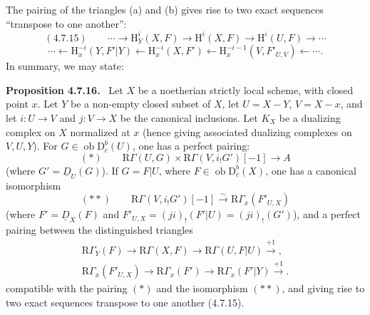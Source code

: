 \documentclass[11pt]{article}
\newenvironment{statement}[1]{\par\medskip\noindent\textbf{#1.}\ }{\par\medskip}
\renewcommand{\H}{\mathrm{H}}
\newcommand{\R}{\mathrm{R}}
\newcommand{\D}{\mathrm{D}}
\newcommand{\ob}{\operatorname{ob}}
\begin{document}
The pairing of the triangles (a) and (b) gives rise to two exact sequences ``transpose to one another'':
\[
(4.7.15)\qquad \cdots\longrightarrow \H_Y^i(X,F)\longrightarrow\H^i(X,F)\longrightarrow\H^i(U,F)\longrightarrow\cdots
\]
\[
\cdots\longleftarrow \H_x^{-i}(Y,F'|Y)\longleftarrow\H_x^{-i}(X,F')\longleftarrow\H_x^{-i-1}(V,F'_{U,V})\longleftarrow\cdots.
\]
In summary, we may state:

\begin{statement}{Proposition 4.7.16}
Let $X$ be a noetherian strictly local scheme, with closed point $x$. Let $Y$ be a non-empty closed subset of $X$, let $U=X-Y$, $V=X-x$, and let $i:U\to V$ and $j:V\to X$ be the canonical inclusions. Let $K_X$ be a dualizing complex on $X$ normalized at $x$ (hence giving associated dualizing complexes on $V,U,Y$). For $G\in\ob\D_c^b(U)$, one has a perfect pairing:
\[
(*)\qquad \R\Gamma(U,G)\times\R\Gamma(V,i_!G')[-1]\longrightarrow A
\]
(where $G'=\underline{D}_U(G)$). If $G=F|U$, where $F\in\ob\D_c^b(X)$, one has a canonical isomorphism
\[
(**)\qquad \R\Gamma(V,i_!G')[-1]\xrightarrow{\sim}\R\Gamma_x(F'_{U,X})
\]
(where $F'=\underline{D}_X(F)$ and $F'_{U,X}=(ji)_!(F'|U)=(ji)_!(G')$), and a perfect pairing between the distinguished triangles
\[
\begin{gathered}
\R\Gamma_Y(F)\longrightarrow \R\Gamma(X,F)\longrightarrow \R\Gamma(U,F|U)\xrightarrow{+1},\\
\R\Gamma_x(F'_{U,X})\longrightarrow \R\Gamma_x(F')\longrightarrow \R\Gamma_x(F'|Y)\xrightarrow{+1}.
\end{gathered}
\]
compatible with the pairing $(*)$ and the isomorphism $(**)$, and giving rise to two exact sequences transpose to one another (4.7.15).
\end{statement}
\end{document}
